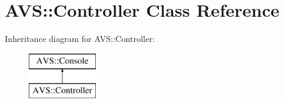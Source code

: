 \hypertarget{classAVS_1_1Controller}{}\section{A\+VS\+:\+:Controller Class Reference}
\label{classAVS_1_1Controller}
Inheritance diagram for A\+VS\+:\+:Controller\+:\begin{figure}[H]
\begin{center}
\leavevmode
\includegraphics[height=2.000000cm]{d1/dae/classAVS_1_1Controller}
\end{center}
\end{figure}
